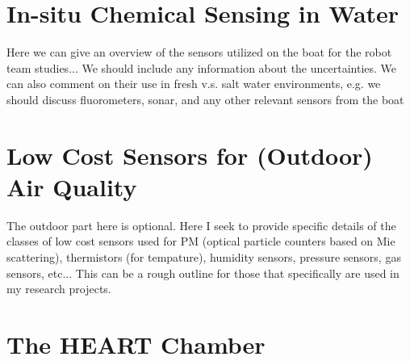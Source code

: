 
\section{In-situ Chemical Sensing in Water}
Here we can give an overview of the sensors utilized on the boat for the robot team studies... We should include any information about the uncertainties. We can also comment on their use in fresh v.s. salt water environments, e.g. we should discuss fluorometers, sonar, and any other relevant sensors from the boat



\section{Low Cost Sensors for (Outdoor) Air Quality}
The outdoor part here is optional. Here I seek to provide specific details of the classes of low cost sensors used for PM (optical particle counters based on Mie scattering), thermistors (for tempature), humidity sensors, pressure sensors, gas sensors, etc... This can be a rough outline for those that specifically are used in my research projects.



\section{The HEART Chamber}










